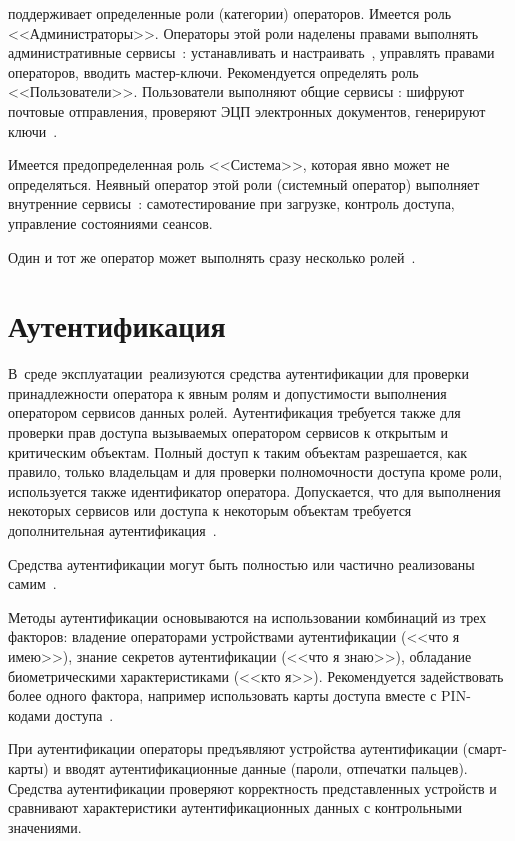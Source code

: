 \TOE поддерживает определенные роли (категории) операторов.
Имеется роль <<Администраторы>>.
Операторы этой роли наделены правами выполнять 
административные сервисы~\TOE:
устанавливать и настраивать~\TOE, 
управлять правами операторов, вводить мастер-ключи.
%
Рекомендуется определять роль <<Пользователи>>.
Пользователи выполняют общие сервисы \TOE:
шифруют почтовые отправления, проверяют ЭЦП электронных документов,
генерируют ключи~.

Имеется предопределенная роль <<Система>>,
которая явно может не определяться.
Неявный оператор этой роли (системный оператор)
выполняет внутренние сервисы~\TOE:
самотестирование при загрузке, 
контроль доступа, управление состояниями сеансов.

Один и тот же оператор может выполнять сразу несколько 
ролей~.

\section{Аутентификация}

В~среде эксплуатации~\TOE реализуются средства аутентификации 
для проверки принадлежности оператора к явным ролям 
и допустимости выполнения оператором 
сервисов данных ролей. 
%
Аутентификация требуется также для проверки прав доступа вызываемых 
оператором сервисов к открытым и критическим объектам. 
Полный доступ к таким объектам разрешается, как правило,
только владельцам и для проверки полномочности доступа кроме 
роли, используется также идентификатор оператора.
%
Допускается, что для выполнения некоторых сервисов 
или доступа к некоторым 
объектам требуется дополнительная аутентификация~.

Средства аутентификации могут быть полностью или частично реализованы 
самим~\TOE.

Методы аутентификации
основываются на использовании комбинаций из трех факторов: 
владение операторами устройствами аутентификации (<<что я имею>>), 
знание секретов аутентификации (<<что я знаю>>), 
обладание биометрическими характеристиками (<<кто я>>).
Рекомендуется задействовать более одного фактора, например использовать 
карты доступа вместе с PIN-кодами доступа~.

При аутентификации операторы предъявляют
устройства аутентификации (смарт-карты) 
и вводят аутентификационные данные (пароли, отпечатки пальцев).
%
Средства аутентификации проверяют корректность представленных устройств и 
сравнивают характеристики аутентификационных данных 
с контрольными значениями.

